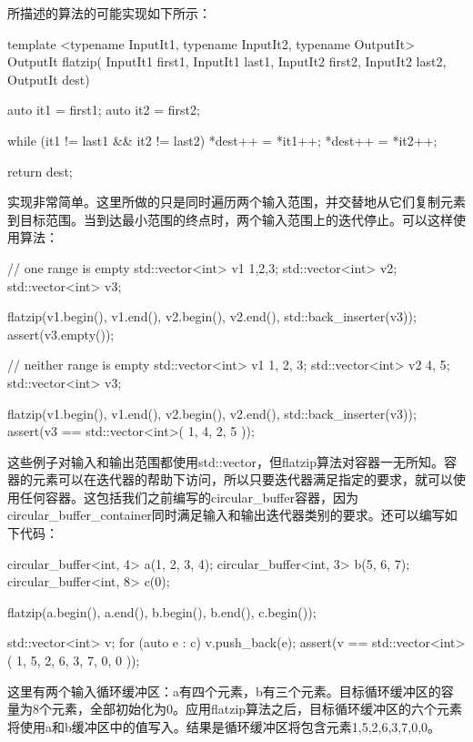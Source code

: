 所描述的算法的可能实现如下所示：

\begin{cppcode}
template <typename InputIt1, typename InputIt2,
		  typename OutputIt>
OutputIt flatzip(
	InputIt1 first1, InputIt1 last1,
	InputIt2 first2, InputIt2 last2,
	OutputIt dest)
{
	auto it1 = first1;
	auto it2 = first2;
	
	while (it1 != last1 && it2 != last2)
	{
		*dest++ = *it1++;
		*dest++ = *it2++;
	}

	return dest;
}
\end{cppcode}

实现非常简单。这里所做的只是同时遍历两个输入范围，并交替地从它们复制元素到目标范围。当到达最小范围的终点时，两个输入范围上的迭代停止。可以这样使用算法：

\begin{cppcode}
// one range is empty
std::vector<int> v1 {1,2,3};
std::vector<int> v2;
std::vector<int> v3;

flatzip(v1.begin(), v1.end(), v2.begin(), v2.end(),
		std::back_inserter(v3));
assert(v3.empty());

// neither range is empty
std::vector<int> v1 {1, 2, 3};
std::vector<int> v2 {4, 5};
std::vector<int> v3;

flatzip(v1.begin(), v1.end(), v2.begin(), v2.end(),
		std::back_inserter(v3));
assert(v3 == std::vector<int>({ 1, 4, 2, 5 }));
\end{cppcode}

这些例子对输入和输出范围都使用std::vector，但flatzip算法对容器一无所知。容器的元素可以在迭代器的帮助下访问，所以只要迭代器满足指定的要求，就可以使用任何容器。这包括我们之前编写的circular_buffer容器，因为circular_buffer_container同时满足输入和输出迭代器类别的要求。还可以编写如下代码：

\begin{cppcode}
circular_buffer<int, 4> a({1, 2, 3, 4});
circular_buffer<int, 3> b({5, 6, 7});
circular_buffer<int, 8> c(0);

flatzip(a.begin(), a.end(), b.begin(), b.end(), c.begin());

std::vector<int> v;
for (auto e : c)
	v.push_back(e);
assert(v == std::vector<int>({ 1, 5, 2, 6, 3, 7, 0, 0 }));
\end{cppcode}

这里有两个输入循环缓冲区：a有四个元素，b有三个元素。目标循环缓冲区的容量为8个元素，全部初始化为0。应用flatzip算法之后，目标循环缓冲区的六个元素将使用a和b缓冲区中的值写入。结果是循环缓冲区将包含元素1,5,2,6,3,7,0,0。













